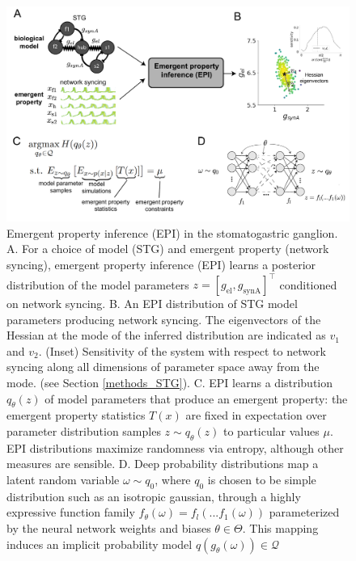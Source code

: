 \documentclass[11pt]{article}
\begin{document}
\begin{figure}
\begin{center}
\includegraphics[scale=0.38]{figures/fig1/fig1.pdf}
\end{center}
\caption{Emergent property inference (EPI) in the stomatogastric ganglion.  A. For a choice of model (STG) and emergent property (network syncing), emergent property inference (EPI) learns a posterior distribution of the model parameters  $z = \left[g_{\text{el}}, g_{\text{synA}} \right]^\top$ conditioned on network syncing. B. An EPI distribution of STG model parameters producing network syncing.  The eigenvectors of the Hessian at the mode of the inferred distribution are indicated as $v_1$ and $v_2$.   (Inset) Sensitivity of the system with respect to network syncing along all dimensions of parameter space away from the mode. (see Section \ref{methods_STG}).  C. EPI learns a distribution $q_\theta(z)$ of model parameters that produce an emergent property: the emergent property statistics $T(x)$ are fixed in expectation over parameter distribution samples $z \sim q_\theta(z)$ to particular values $\mu$.  EPI distributions maximize randomness via entropy, although other measures are sensible.  D. Deep probability distributions map a latent random variable $\omega \sim q_0$, where $q_0$ is chosen to be simple distribution such as an isotropic gaussian, through a highly expressive function family $f_\theta(\omega) = f_l(...f_1(\omega))$ parameterized by the neural network weights and biases $\theta \in \Theta$. This mapping induces an implicit probability model $q(g_\theta(\omega)) \in \mathcal{Q}$ }
\end{figure}


\end{document}
